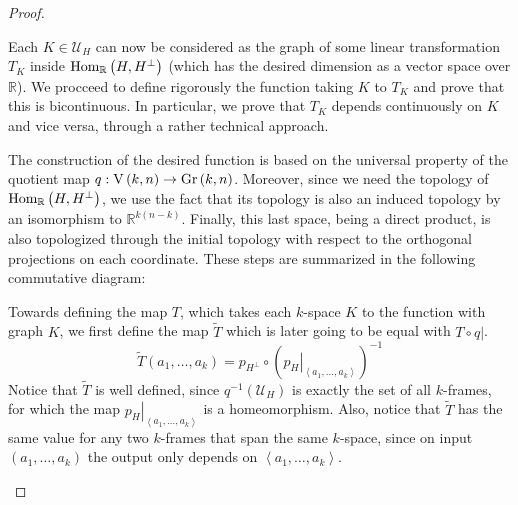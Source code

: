 \begin{proof}
\begin{b_item}
Each $K\in\mathcal{U}_H$ can now be considered as the graph of some linear transformation $T_K$ inside $\mathrm{Hom}_{\mathbb{R}}\left(H,H^{\perp}\right)$ (which has the desired dimension as a vector space over $\mathbb{R}$). We procceed to define rigorously the function taking $K$ to $T_K$ and prove that this is bicontinuous. In particular, we prove that $T_K$ depends continuously on $K$ and vice versa, through a rather technical approach.

The construction of the desired function is based on the universal property of the quotient map $q:\St{k}{n}\to\Gr{k}{n}$. Moreover, since we need the topology of $\mathrm{Hom}_{\mathbb{R}}\left(H,H^{\perp}\right)$, we use the fact that its topology is also an induced topology by an isomorphism to $\mathbb{R}^{k(n-k)}$. Finally, this last space, being a direct product, is also topologized through the initial topology with respect to the orthogonal projections on each coordinate. These steps are summarized in the following commutative diagram:

\begin{center}
\end{center}
Towards defining the map $T$, which takes each $k$-space $K$ to the function with graph $K$, we first define the map $\tilde T$ which is later going to be equal with $T\circ\left.q\right|$.
\[\tilde T(a_1,\ldots,a_k)=p_{H^{\perp}}\circ{\left(\left.p_H\right|_{\left<a_1,\ldots,a_k\right>}\right)}^{-1}\]
Notice that $\tilde T$ is well defined, since $q^{-1}\left(\mathcal{U}_H\right)$ is exactly the set of all $k$-frames, for which the map $\left.p_H\right|_{\left<a_1,\ldots,a_k\right>}$ is a homeomorphism. Also, notice that $\tilde T$ has the same value for any two $k$-frames that span the same $k$-space, since on input $(a_1,\ldots,a_k)$ the output only depends on $\left<a_1,\ldots,a_k\right>$.


\end{b_item}
\end{proof}
